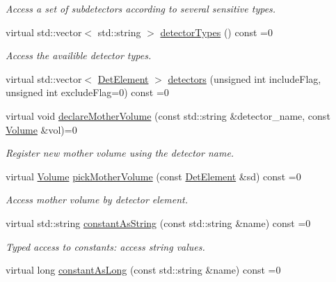 \begin{DoxyCompactItemize}
\begin{DoxyCompactList}\small\item\em Access a set of subdetectors according to several sensitive types. \end{DoxyCompactList}\item 
virtual std\+::vector$<$ std\+::string $>$ \hyperlink{class_d_d4hep_1_1_geometry_1_1_l_c_d_d_a196cc776b69db52d89f3396bf03d224f}{detector\+Types} () const =0
\begin{DoxyCompactList}\small\item\em Access the availible detector types. \end{DoxyCompactList}\item 
virtual std\+::vector$<$ \hyperlink{class_d_d4hep_1_1_geometry_1_1_det_element}{Det\+Element} $>$ \hyperlink{class_d_d4hep_1_1_geometry_1_1_l_c_d_d_a1cdc7a631ac397f64b40e7232ee04639}{detectors} (unsigned int include\+Flag, unsigned int exclude\+Flag=0) const =0
\item 
virtual void \hyperlink{class_d_d4hep_1_1_geometry_1_1_l_c_d_d_a6cbadc0074dd9cc3b88b5e0a527586a2}{declare\+Mother\+Volume} (const std\+::string \&detector\+\_\+name, const \hyperlink{class_d_d4hep_1_1_geometry_1_1_volume}{Volume} \&vol)=0
\begin{DoxyCompactList}\small\item\em Register new mother volume using the detector name. \end{DoxyCompactList}\item 
virtual \hyperlink{class_d_d4hep_1_1_geometry_1_1_volume}{Volume} \hyperlink{class_d_d4hep_1_1_geometry_1_1_l_c_d_d_ad239fb24b7d6eb41abf697f2710ad6a3}{pick\+Mother\+Volume} (const \hyperlink{class_d_d4hep_1_1_geometry_1_1_det_element}{Det\+Element} \&sd) const =0
\begin{DoxyCompactList}\small\item\em Access mother volume by detector element. \end{DoxyCompactList}\item 
virtual std\+::string \hyperlink{class_d_d4hep_1_1_geometry_1_1_l_c_d_d_a6857611520c86f1d242a1698ab5c181f}{constant\+As\+String} (const std\+::string \&name) const =0
\begin{DoxyCompactList}\small\item\em Typed access to constants\+: access string values. \end{DoxyCompactList}\item 
virtual long \hyperlink{class_d_d4hep_1_1_geometry_1_1_l_c_d_d_a95370880f4063064af089b943b0e4ce2}{constant\+As\+Long} (const std\+::string \&name) const =0

\end{DoxyCompactItemize}
